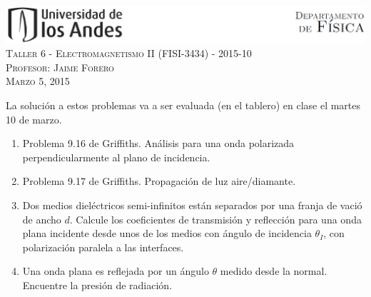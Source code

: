 \documentclass[letterpaper,10pt,onecolumn]{article}
\begin{document}
\begin{center}

\includegraphics[width=490pt]{header.png}\\[0.5cm]

\textsc{\LARGE Taller 6 - Electromagnetismo II (FISI-3434) - 2015-10}\\[0.5cm]

\textsc{\Large{Profesor: Jaime Forero}} \\[0.5cm]

\textsc{Marzo 5, 2015} \\[0.5cm]

\end{center}

La soluci\'on a estos problemas va a ser evaluada (en el tablero) en
clase el martes 10 de marzo. 

\begin{enumerate}
\item Problema 9.16 de Griffiths. An\'alisis para
  una onda polarizada perpendicularmente al plano de incidencia.
\item Problema 9.17 de Griffiths. Propagaci\'on de luz aire/diamante.
\item Dos medios diel\'ectricos semi-infinitos est\'an separados por
  una franja de vaci\'o de ancho $d$. Calcule los coeficientes de
  transmisi\'on y reflecci\'on para una onda plana incidente desde
  unos de los medios con \'angulo de incidencia $\theta_I$, con
  polarizaci\'on paralela a las interfaces. 
\item Una onda plana es reflejada por un \'angulo $\theta$ medido
  desde la normal. Encuentre la presi\'on de radiaci\'on.

\end{enumerate}
\end{document}
